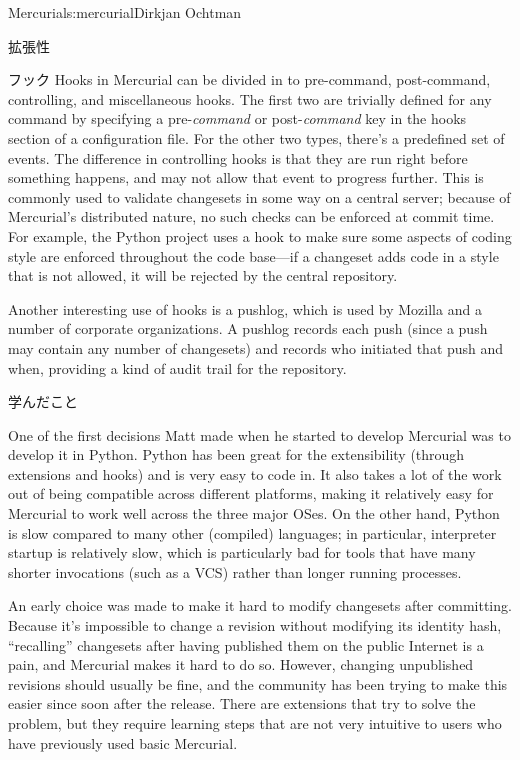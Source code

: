 \begin{aosachapter}{Mercurial}{s:mercurial}{Dirkjan Ochtman}
\begin{aosasect1}{拡張性}
\begin{aosasect2}{フック}
Hooks in Mercurial can be divided in to pre-command, post-command,
controlling, and miscellaneous hooks. The first two are trivially
defined for any command by specifying a pre-\emph{command} or
post-\emph{command} key in the hooks section of a configuration
file. For the other two types, there's a predefined set of events. The
difference in controlling hooks is that they are run right before
something happens, and may not allow that event to progress further.
This is commonly used to validate changesets in some way on a central
server; because of Mercurial's distributed nature, no such checks can
be enforced at commit time. For example, the Python project uses a
hook to make sure some aspects of coding style are enforced throughout
the code base---if a changeset adds code in a style that is not
allowed, it will be rejected by the central repository.

Another interesting use of hooks is a pushlog, which is used by
Mozilla and a number of corporate organizations. A pushlog
records each push (since a push may contain any number of
changesets) and records who initiated that push and when, providing
a kind of audit trail for the repository.

\end{aosasect2}

\end{aosasect1}

\begin{aosasect1}{学んだこと}

One of the first decisions Matt made when he started to develop
Mercurial was to develop it in Python. Python has been great for the
extensibility (through extensions and hooks) and is very easy to code
in. It also takes a lot of the work out of being compatible across
different platforms, making it relatively easy for Mercurial to work
well across the three major OSes. On the other hand, Python is slow
compared to many other (compiled) languages; in particular,
interpreter startup is relatively slow, which is particularly bad for
tools that have many shorter invocations (such as a VCS) rather than
longer running processes.

An early choice was made to make it hard to modify changesets after
committing. Because it's impossible to change a revision without
modifying its identity hash, ``recalling'' changesets after having
published them on the public Internet is a pain, and Mercurial makes
it hard to do so. However, changing unpublished revisions should
usually be fine, and the community has been trying to make this easier
since soon after the release. There are extensions that try to solve
the problem, but they require learning steps that are not very
intuitive to users who have previously used basic Mercurial.


\end{aosasect1}
\end{aosachapter}
